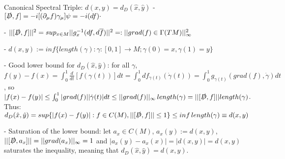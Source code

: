 \begin{frame}{Canonical Spectral Triple: $d(x, y) = d_D(\hat x, \hat y)$}
    - $[\slashed D, f] = -i [(\partial_\mu f) \gamma_\mu] \psi = -i(df)\cdot$
    
    - $||[\slashed D, f]||^2 = sup_{x \in M} ||g_x^{-1}(df, d \overline{f})||^2 =: ||grad(f) \in \Gamma(TM)||_\infty^2$

    - $d(x, y) := inf\{length(\gamma): \gamma:[0,1] \to M; \gamma(0) = x, \gamma(1) = y\}$
    
    - Good lower bound for $d_D(\hat x, \hat y)$: for all $\gamma$, $f(y) - f(x) = \int_0^1 \frac{d}{dt}[f(\gamma(t))]dt = \int_0^1 df_{\gamma(t)} (\dot \gamma(t)) = \int_0^1 g_{\gamma(t)}(grad(f), \dot \gamma) dt$, 
    so
    $|f(x) - f(y)| \leq \int_0^1 |grad(f)| |\dot \gamma(t)| dt \leq ||grad(f)||_
    \infty \, length(\gamma) = ||[\slashed D, f]|| length(\gamma)$. 
    Thus:
    $d_D(\hat x, \hat y) = sup\{|f(x) - f(y)|: f \in C(M), ||[\slashed D, f]||\leq 1\} \leq inf \, length(\gamma) \equiv d(x, y)$
    
    - Saturation of the lower bound: let $a_x \in C(M)$, $a_x(y) := d(x, y)$, %
    $||[\slashed D, a_x]|| = ||grad(a_x)||_\infty = 1$ and $|a_x(y) - a_x(x)| = |d(x,y)| = d(x,y)$ saturates the inequality, meaning that $ d_D(\hat x, \hat y) = d(x, y)$.
    
    
    
\end{frame}


